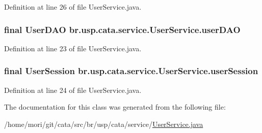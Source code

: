 Definition at line 26 of file User\+Service.\+java.

\hypertarget{classbr_1_1usp_1_1cata_1_1service_1_1_user_service_a9b0f4eea06df1452846855d39518849a}{
\subsubsection[{user\+D\+A\+O}]{\setlength{\rightskip}{0pt plus 5cm}final {\bf User\+D\+A\+O} br.\+usp.\+cata.\+service.\+User\+Service.\+user\+D\+A\+O\hspace{0.3cm}{\ttfamily [private]}}}\label{classbr_1_1usp_1_1cata_1_1service_1_1_user_service_a9b0f4eea06df1452846855d39518849a}


Definition at line 23 of file User\+Service.\+java.

\hypertarget{classbr_1_1usp_1_1cata_1_1service_1_1_user_service_a187626d53b70452a3a3d555a0caf8895}{
\subsubsection[{user\+Session}]{\setlength{\rightskip}{0pt plus 5cm}final {\bf User\+Session} br.\+usp.\+cata.\+service.\+User\+Service.\+user\+Session\hspace{0.3cm}{\ttfamily [private]}}}\label{classbr_1_1usp_1_1cata_1_1service_1_1_user_service_a187626d53b70452a3a3d555a0caf8895}


Definition at line 24 of file User\+Service.\+java.



The documentation for this class was generated from the following file\+:\begin{DoxyCompactItemize}
\item 
/home/mori/git/cata/src/br/usp/cata/service/\hyperlink{_user_service_8java}{User\+Service.\+java}\end{DoxyCompactItemize}
